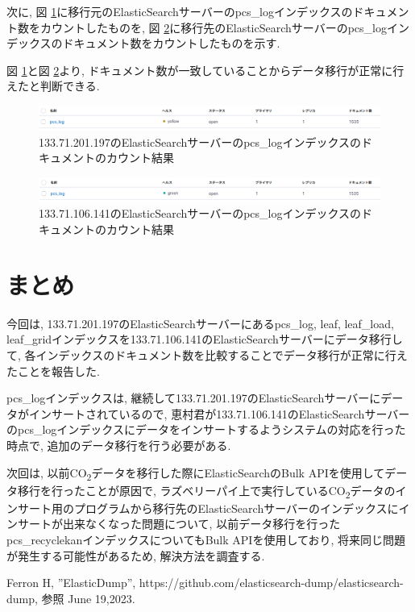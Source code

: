 \documentclass[a4j,12pt,]{jarticle}
\begin{document}
次に, 図 \ref{p4}に移行元のElasticSearchサーバーのpcs\_logインデックスのドキュメント数をカウントしたものを, 図 \ref{p5}に移行先のElasticSearchサーバーのpcs\_logインデックスのドキュメント数をカウントしたものを示す.

図 \ref{p4}と図 \ref{p5}より, ドキュメント数が一致していることからデータ移行が正常に行えたと判断できる.

\begin{figure}[H]
  \begin{center}
    \includegraphics[width=160mm]{197pcs.png}
    \caption{133.71.201.197のElasticSearchサーバーのpcs\_logインデックスのドキュメントのカウント結果}
    \label{p4}
  \end{center}
\end{figure}

\begin{figure}[H]
  \begin{center}
    \includegraphics[width=160mm]{141pcs.png}
    \caption{133.71.106.141のElasticSearchサーバーのpcs\_logインデックスのドキュメントのカウント結果}
    \label{p5}
  \end{center}
\end{figure}

\section{まとめ}
今回は, 133.71.201.197のElasticSearchサーバーにあるpcs\_log, leaf, leaf\_load, leaf\_gridインデックスを133.71.106.141のElasticSearchサーバーにデータ移行して, 各インデックスのドキュメント数を比較することでデータ移行が正常に行えたことを報告した.

pcs\_logインデックスは, 継続して133.71.201.197のElasticSearchサーバーにデータがインサートされているので, 恵村君が133.71.106.141のElasticSearchサーバーのpcs\_logインデックスにデータをインサートするようシステムの対応を行った時点で, 追加のデータ移行を行う必要がある.

次回は, 以前CO\textsubscript{2}データを移行した際にElasticSearchのBulk APIを使用してデータ移行を行ったことが原因で, ラズベリーパイ上で実行しているCO\textsubscript{2}データのインサート用のプログラムから移行先のElasticSearchサーバーのインデックスにインサートが出来なくなった問題について, 以前データ移行を行ったpcs\_recyclekanインデックスについてもBulk APIを使用しており, 将来同じ問題が発生する可能性があるため, 解決方法を調査する.

\begin{thebibliography}{5}
  Ferron H, ”ElasticDump”, https://github.com/elasticsearch-dump/elasticsearch-dump, 参照 June 19,2023.
\end{thebibliography}
\end{document}
